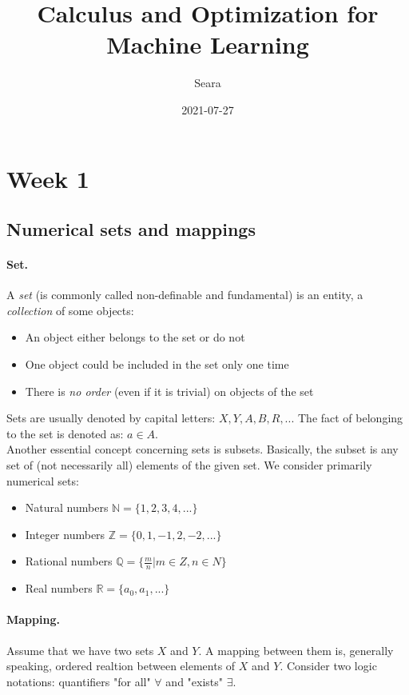 \documentclass{article}
\title{Calculus and Optimization for Machine Learning}
\date{2021-07-27}
\author{Seara}
\newcommand{\R}{\mathbb{R}}
\newcommand{\Q}{\mathbb{Q}}
\newcommand{\N}{\mathbb{N}}
\newcommand{\Z}{\mathbb{Z}}
\begin{document}
\maketitle
\newpage
{}

\section{Week 1}

\subsection{Numerical sets and mappings}

\paragraph{Set.}
A {\it set} (is commonly called non-definable and fundamental) is an entity, a {\it collection} of some objects:
\begin{itemize}
    \item An object either belongs to the set or do not
    \item One object could be included in the set only one time
    \item There is {\it no order} (even if it is trivial) on objects of the set
\end{itemize}
Sets are usually denoted by capital letters: $X, Y, A, B, R, ...$ The fact of belonging to the set is denoted as: $a \in A$.
\\
Another essential concept concerning sets is subsets. Basically, the subset is any set of (not necessarily all) elements of the given set. We consider primarily numerical sets:
\begin{itemize}
    \item Natural numbers $\N= \{1, 2, 3, 4, ...\}$
    \item Integer numbers $\Z = \{0, 1, -1, 2, -2, ...\}$
    \item Rational numbers $\Q = \{\frac{m}{n} | m \in Z, n \in N\}$
    \item Real numbers $\R=\{a_0, a_1, ...\}$
\end{itemize}

\paragraph{Mapping.}
Assume that we have two sets $X$ and $Y$. A mapping between them is, generally speaking, ordered realtion between elements of $X$ and $Y$. Consider two logic notations: quantifiers "for all" $\forall$ and "exists" $\exists$.
\end{document}
